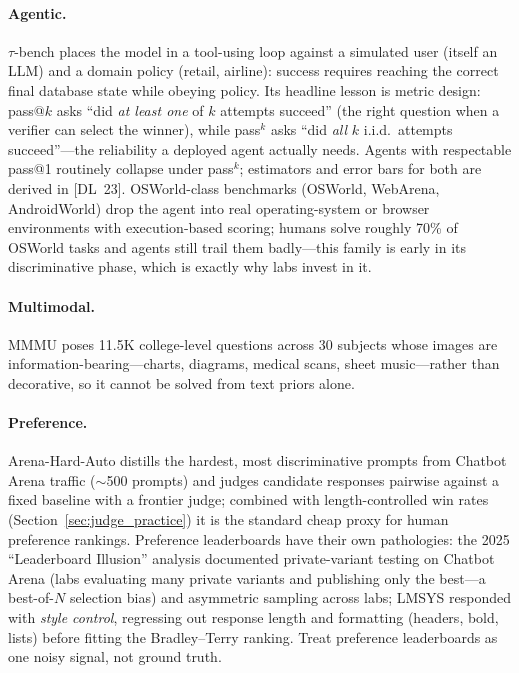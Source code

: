 \paragraph{Agentic.}
$\tau$-bench places the model in a tool-using loop against a simulated user
(itself an LLM) and a domain policy (retail, airline): success requires
reaching the correct final database state while obeying policy.  Its headline
lesson is metric design: pass@$k$ asks ``did \emph{at least one} of $k$
attempts succeed'' (the right question when a verifier can select the
winner), while pass$^k$ asks ``did \emph{all} $k$ i.i.d.\ attempts
succeed''---the reliability a deployed agent actually needs.  Agents with
respectable pass@1 routinely collapse under pass$^k$; estimators and error
bars for both are derived in [DL~23].  OSWorld-class benchmarks (OSWorld,
WebArena, AndroidWorld) drop the agent into real operating-system or browser
environments with execution-based scoring; humans solve roughly 70\% of
OSWorld tasks and agents still trail them badly---this family is early in its
discriminative phase, which is exactly why labs invest in it.

\paragraph{Multimodal.}
MMMU poses 11.5K college-level questions across 30 subjects whose images are
information-bearing---charts, diagrams, medical scans, sheet music---rather
than decorative, so it cannot be solved from text priors alone.

\paragraph{Preference.}
Arena-Hard-Auto distills the hardest, most discriminative prompts from
Chatbot Arena traffic ($\sim$500 prompts) and judges candidate responses
pairwise against a fixed baseline with a frontier judge; combined with
length-controlled win rates (Section~\ref{sec:judge_practice}) it is the
standard cheap proxy for human preference rankings.  Preference leaderboards
have their own pathologies: the 2025 ``Leaderboard Illusion'' analysis
documented private-variant testing on Chatbot Arena (labs evaluating many
private variants and publishing only the best---a best-of-$N$ selection bias)
and asymmetric sampling across labs; LMSYS responded with \emph{style
control}, regressing out response length and formatting (headers, bold,
lists) before fitting the Bradley--Terry ranking.  Treat preference
leaderboards as one noisy signal, not ground truth.


